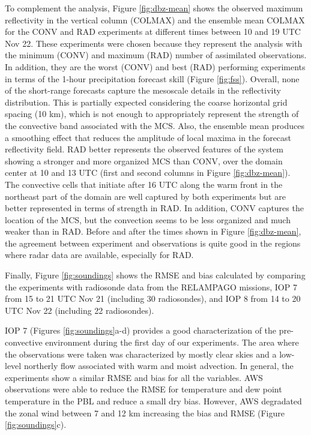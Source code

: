 \documentclass[final,5p,times,twocolumn,authoryear]{elsarticle} %
\begin{document}
To complement the analysis, Figure \ref{fig:dbz-mean} shows the observed maximum reflectivity in the vertical column (COLMAX) and the ensemble mean COLMAX for the CONV and RAD experiments at different times between 10 and 19 UTC Nov 22. These experiments were chosen because they represent the analysis with the minimum (CONV) and maximum (RAD) number of assimilated observations. In addition, they are the worst (CONV) and best (RAD) performing experiments in terms of the 1-hour precipitation forecast skill (Figure \ref{fig:fss}). Overall, none of the short-range forecasts capture the mesoscale details in the reflectivity distribution. This is partially expected considering the coarse horizontal grid spacing (10 km), which is not enough to appropriately represent the strength of the convective band associated with the MCS. Also, the ensemble mean produces a smoothing effect that reduces the amplitude of local maxima in the forecast reflectivity field. RAD better represents the observed features of the system showing a stronger and more organized MCS than CONV, over the domain center at 10 and 13 UTC (first and second columns in Figure \ref{fig:dbz-mean}). The convective cells that initiate after 16 UTC along the warm front in the northeast part of the domain are well captured by both experiments but are better represented in terms of strength in RAD. In addition, CONV captures the location of the MCS, but the convection seems to be less organized and much weaker than in RAD. Before and after the times shown in Figure \ref{fig:dbz-mean}, the agreement between experiment and observations is quite good in the regions where radar data are available, especially for RAD.

Finally, Figure \ref{fig:soundings} shows the RMSE and bias calculated by comparing the experiments with radiosonde data from the RELAMPAGO missions, IOP 7 from 15 to 21 UTC Nov 21 (including 30 radiosondes), and IOP 8 from 14 to 20 UTC Nov 22 (including 22 radiosondes).

IOP 7 (Figures \ref{fig:soundings}a-d) provides a good characterization of the pre-convective environment during the first day of our experiments. The area where the observations were taken was characterized by mostly clear skies and a low-level northerly flow associated with warm and moist advection. In general, the experiments show a similar RMSE and bias for all the variables. AWS observations were able to reduce the RMSE for temperature and dew point temperature in the PBL and reduce a small dry bias. However, AWS degradated the zonal wind between 7 and 12 km increasing the bias and RMSE (Figure \ref{fig:soundings}c).
\end{document}
